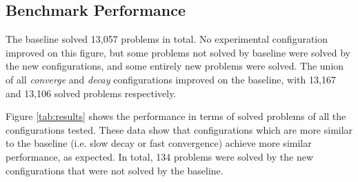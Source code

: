 \documentclass{llncs}
\begin{document}
\subsection{Benchmark Performance}
The baseline solved 13,057 problems in total.
No experimental configuration improved on this figure, but some problems not solved by baseline were solved by the new configurations, and some entirely new problems were solved.
The union of all \emph{converge} and \emph{decay} configurations improved on the baseline, with 13,167 and 13,106 solved problems respectively.

Figure \ref{tab:results} shows the performance in terms of solved problems of all the configurations tested.
These data show that configurations which are more similar to the baseline (i.e. slow decay or fast convergence) achieve more similar performance, as expected.
In total, 134 problems were solved by the new configurations that were not solved by the baseline.
\end{document}
